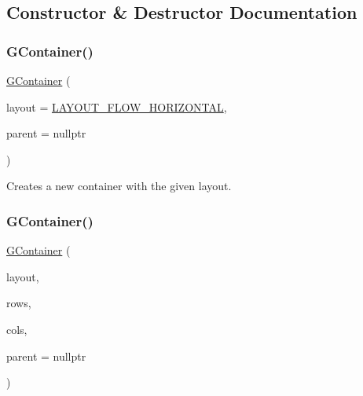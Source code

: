 \subsection{Constructor \& Destructor Documentation}
\mbox{\label{classsgl_1_1GContainer_a09fc5a49b2ea0bc895fbf2772c311325}} 
\subsubsection{\texorpdfstring{G\+Container()}{GContainer()}\hspace{0.1cm}{\footnotesize\ttfamily [1/2]}}
{\footnotesize\ttfamily \mbox{\hyperlink{classsgl_1_1GContainer}{G\+Container}} (\begin{DoxyParamCaption}\item[{\mbox{\hyperlink{classsgl_1_1GContainer_a1b7da28ed84c0763e8f92cde2df4799b}{Layout}}}]{layout = {\ttfamily \mbox{\hyperlink{classsgl_1_1GContainer_a1b7da28ed84c0763e8f92cde2df4799bac89a811e02b929a18f7f34e7d3bebd63}{L\+A\+Y\+O\+U\+T\+\_\+\+F\+L\+O\+W\+\_\+\+H\+O\+R\+I\+Z\+O\+N\+T\+AL}}},  }\item[{Q\+Widget $\ast$}]{parent = {\ttfamily nullptr} }\end{DoxyParamCaption})}



Creates a new container with the given layout. 

\mbox{\label{classsgl_1_1GContainer_a042cb94e18801664efa748e8a8fa74c1}} 
\subsubsection{\texorpdfstring{G\+Container()}{GContainer()}\hspace{0.1cm}{\footnotesize\ttfamily [2/2]}}
{\footnotesize\ttfamily \mbox{\hyperlink{classsgl_1_1GContainer}{G\+Container}} (\begin{DoxyParamCaption}\item[{\mbox{\hyperlink{classsgl_1_1GContainer_a1b7da28ed84c0763e8f92cde2df4799b}{Layout}}}]{layout,  }\item[{int}]{rows,  }\item[{int}]{cols,  }\item[{Q\+Widget $\ast$}]{parent = {\ttfamily nullptr} }\end{DoxyParamCaption})}



